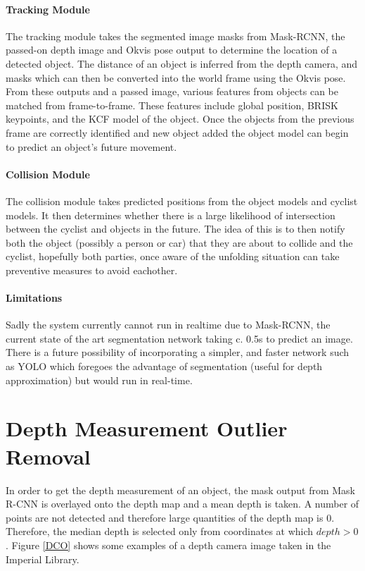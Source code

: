 \documentclass[11pt,twoside]{report}
\begin{document}
\paragraph{Tracking Module}

The tracking module takes the segmented image masks from Mask-RCNN, the passed-on depth image and Okvis pose output to determine the location of a detected object. The distance of an object is inferred from the depth camera, and masks which can then be converted into the world frame using the Okvis pose. From these outputs and a passed image, various features from objects can be matched from frame-to-frame. These features include global position, BRISK keypoints, and the KCF model of the object. Once the objects from the previous frame are correctly identified and new object added the object model can begin to predict an object's future movement.

\paragraph{Collision Module}
The collision module takes predicted positions from the object models and cyclist models. It then determines whether there is a large likelihood of intersection between the cyclist and objects in the future. The idea of this is to then notify both the object (possibly a person or car) that they are about to collide and the cyclist, hopefully both parties, once aware of the unfolding situation can take preventive measures to avoid eachother.

\paragraph{Limitations}
Sadly the system currently cannot run in realtime due to Mask-RCNN, the current state of the art segmentation network taking c. 0.5s to predict an image. There is a future possibility of incorporating a simpler, and faster network such as YOLO which foregoes the advantage of segmentation (useful for depth approximation) but would run in real-time.


\section{Depth Measurement Outlier Removal} \label{Depth_approx}

In order to get the depth measurement of an object, the mask output from Mask R-CNN is overlayed onto the depth map and a mean depth is taken. A number of points are not detected and therefore large quantities of the depth map is 0. Therefore, the median depth is selected only from coordinates at which $depth>0$. Figure \ref{DCO} shows some examples of a depth camera image taken in the Imperial Library.
\end{document}
